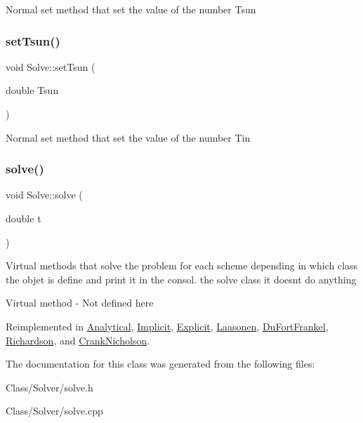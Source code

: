 Normal set method that set the value of the number Tsun \mbox{\label{class_solve_a2088840c7117930845bc61444cbba285}} 
\subsubsection{\texorpdfstring{set\+Tsun()}{setTsun()}}
{\footnotesize\ttfamily void Solve\+::set\+Tsun (\begin{DoxyParamCaption}\item[{double}]{Tsun }\end{DoxyParamCaption})}

Normal set method that set the value of the number Tin \mbox{\label{class_solve_a1a56722993fdabea9928637d7dd8a2c7}} 
\subsubsection{\texorpdfstring{solve()}{solve()}}
{\footnotesize\ttfamily void Solve\+::solve (\begin{DoxyParamCaption}\item[{double}]{t }\end{DoxyParamCaption})\hspace{0.3cm}{\ttfamily [virtual]}}

Virtual methods that solve the problem for each scheme depending in which class the objet is define and print it in the consol.  the solve class it doesn\textquotesingle{}t do anything

Virtual method -\/ Not defined here 

Reimplemented in \hyperlink{class_analytical_a8fe1d5769bb516115a31719222eb9ae5}{Analytical}, \hyperlink{class_implicit_a027adb4276376991f75fcffbd34740b3}{Implicit}, \hyperlink{class_explicit_ac99aa17bfd95f66b33e5c0ecf0e53785}{Explicit}, \hyperlink{class_laasonen_aaa49ab7d15fbfef94a57a0e89977d1c6}{Laasonen}, \hyperlink{class_du_fort_frankel_a73204223c7ace1e3f95e5d89d02c5208}{Du\+Fort\+Frankel}, \hyperlink{class_richardson_ab8dd2ff0e58c11092fead4d45a4f5c64}{Richardson}, and \hyperlink{class_crank_nicholson_a999d04c6ef97b0794f66584f9192dbee}{Crank\+Nicholson}.



The documentation for this class was generated from the following files\+:\begin{DoxyCompactItemize}
\item 
Class/\+Solver/solve.\+h\item 
Class/\+Solver/solve.\+cpp\end{DoxyCompactItemize}
